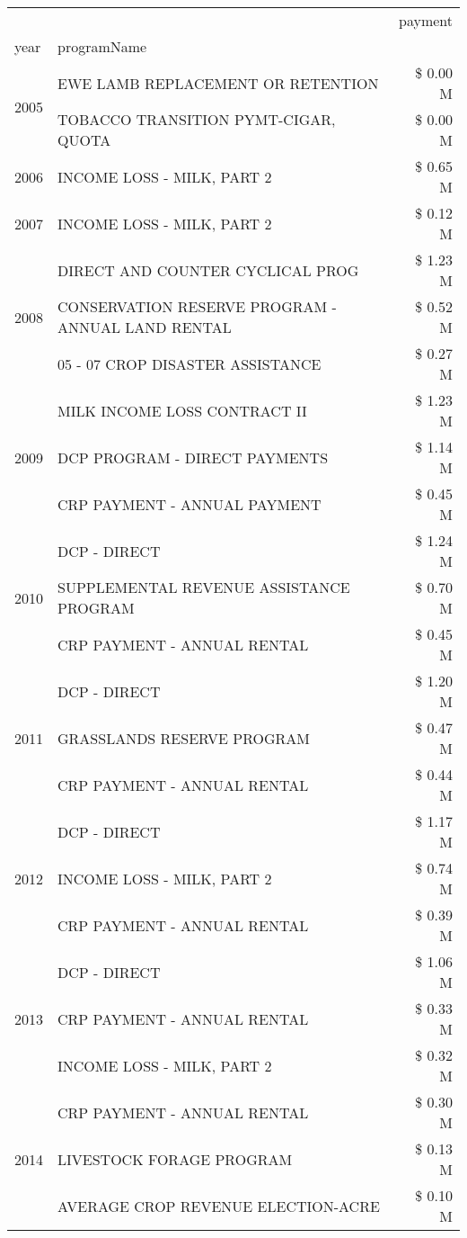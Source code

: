 \begin{tabular}{llr}
\toprule
 &  & payment \\
year & programName &  \\
\midrule
\multirow[t]{2}{*}{2005} & EWE LAMB REPLACEMENT OR RETENTION & \$ 0.00 M \\
 & TOBACCO TRANSITION PYMT-CIGAR, QUOTA & \$ 0.00 M \\
\cline{1-3}
2006 & INCOME LOSS - MILK, PART 2 & \$ 0.65 M \\
\cline{1-3}
2007 & INCOME LOSS - MILK, PART 2 & \$ 0.12 M \\
\cline{1-3}
\multirow[t]{3}{*}{2008} & DIRECT AND COUNTER CYCLICAL PROG & \$ 1.23 M \\
 & CONSERVATION RESERVE PROGRAM - ANNUAL LAND RENTAL & \$ 0.52 M \\
 & 05 - 07 CROP DISASTER ASSISTANCE & \$ 0.27 M \\
\cline{1-3}
\multirow[t]{3}{*}{2009} & MILK INCOME LOSS CONTRACT II & \$ 1.23 M \\
 & DCP PROGRAM - DIRECT PAYMENTS & \$ 1.14 M \\
 & CRP PAYMENT - ANNUAL PAYMENT & \$ 0.45 M \\
\cline{1-3}
\multirow[t]{3}{*}{2010} & DCP - DIRECT & \$ 1.24 M \\
 & SUPPLEMENTAL REVENUE ASSISTANCE PROGRAM & \$ 0.70 M \\
 & CRP PAYMENT - ANNUAL RENTAL & \$ 0.45 M \\
\cline{1-3}
\multirow[t]{3}{*}{2011} & DCP - DIRECT & \$ 1.20 M \\
 & GRASSLANDS RESERVE PROGRAM & \$ 0.47 M \\
 & CRP PAYMENT - ANNUAL RENTAL & \$ 0.44 M \\
\cline{1-3}
\multirow[t]{3}{*}{2012} & DCP - DIRECT & \$ 1.17 M \\
 & INCOME LOSS - MILK, PART 2 & \$ 0.74 M \\
 & CRP PAYMENT - ANNUAL RENTAL & \$ 0.39 M \\
\cline{1-3}
\multirow[t]{3}{*}{2013} & DCP - DIRECT & \$ 1.06 M \\
 & CRP PAYMENT - ANNUAL RENTAL & \$ 0.33 M \\
 & INCOME LOSS - MILK, PART 2 & \$ 0.32 M \\
\cline{1-3}
\multirow[t]{3}{*}{2014} & CRP PAYMENT - ANNUAL RENTAL & \$ 0.30 M \\
 & LIVESTOCK FORAGE PROGRAM & \$ 0.13 M \\
 & AVERAGE CROP REVENUE ELECTION-ACRE & \$ 0.10 M \\

\end{tabular}
